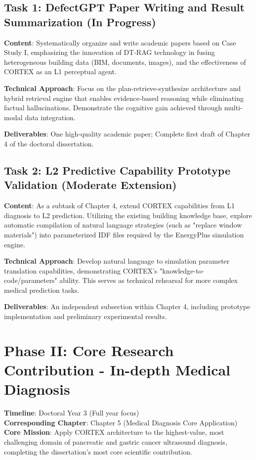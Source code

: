 \subsection{Task 1: DefectGPT Paper Writing and Result Summarization (In Progress)}

\textbf{Content}: Systematically organize and write academic papers based on Case Study I, emphasizing the innovation of DT-RAG technology in fusing heterogeneous building data (BIM, documents, images), and the effectiveness of CORTEX as an L1 perceptual agent.

\textbf{Technical Approach}: Focus on the plan-retrieve-synthesize architecture and hybrid retrieval engine that enables evidence-based reasoning while eliminating factual hallucinations. Demonstrate the cognitive gain achieved through multi-modal data integration.

\textbf{Deliverables}: One high-quality academic paper; Complete first draft of Chapter 4 of the doctoral dissertation.

\subsection{Task 2: L2 Predictive Capability Prototype Validation (Moderate Extension)}

\textbf{Content}: As a subtask of Chapter 4, extend CORTEX capabilities from L1 diagnosis to L2 prediction. Utilizing the existing building knowledge base, explore automatic compilation of natural language strategies (such as "replace window materials") into parameterized IDF files required by the EnergyPlus simulation engine.

\textbf{Technical Approach}: Develop natural language to simulation parameter translation capabilities, demonstrating CORTEX's "knowledge-to-code/parameters" ability. This serves as technical rehearsal for more complex medical prediction tasks.

\textbf{Deliverables}: An independent subsection within Chapter 4, including prototype implementation and preliminary experimental results.

\section{Phase II: Core Research Contribution - In-depth Medical Diagnosis}

\textbf{Timeline}: Doctoral Year 3 (Full year focus)\\
\textbf{Corresponding Chapter}: Chapter 5 (Medical Diagnosis Core Application)\\
\textbf{Core Mission}: Apply CORTEX architecture to the highest-value, most challenging domain of pancreatic and gastric cancer ultrasound diagnosis, completing the dissertation's most core scientific contribution.

